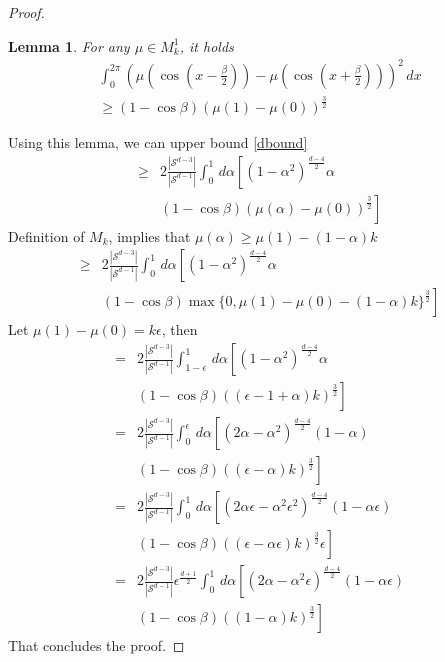 \documentclass[twoside]{article} \usepackage{aistats2017}
\newtheorem{lemma}[theorem]{Lemma}
\begin{document}
\begin{proof}
\begin{lemma}
        For any $\mu\in M_k^1$, it holds
        \begin{align*}
            \int_{0}^{2\pi}\left(\mu(\cos(x-\frac{\beta}{2}))-\mu( \cos(x+\frac{\beta}{2}))\right)^2\, dx\\
            \geq (1-\cos{\beta})(\mu(1)-\mu(0))^\frac{3}{2}
        \end{align*}
    \end{lemma}
    Using this lemma, we can upper bound \eqref{dbound} 
    \begin{align*}
        \geq&2\frac{|\mathcal{S}^{d-3}|}{|\mathcal{S}^{d-1}|}\int_{0}^{1}\,d\alpha\left[(1-\alpha^2)^{\frac{d-4}{2}}\alpha\right.\\
    &\left.(1-\cos{\beta})(\mu(\alpha)-\mu(0))^\frac{3}{2}\right]
    \end{align*}
    Definition of $M_k$, implies that $\mu(\alpha)\geq \mu(1)-(1-\alpha)k$
    \begin{align*}
        \geq&2\frac{|\mathcal{S}^{d-3}|}{|\mathcal{S}^{d-1}|}\int_{0}^{1}\,d\alpha\left[(1-\alpha^2)^{\frac{d-4}{2}}\alpha\right.\\
    &\left.(1-\cos{\beta})\max\{0,\mu(1)-\mu(0)-(1-\alpha)k\}^\frac{3}{2}\right]
    \end{align*}
Let $\mu(1)-\mu(0) =k\epsilon$, then
    \begin{align*}
        =&2\frac{|\mathcal{S}^{d-3}|}{|\mathcal{S}^{d-1}|}\int_{1-\epsilon}^{1}\,d\alpha\left[(1-\alpha^2)^{\frac{d-4}{2}}\alpha\right.\\
    &\left.(1-\cos{\beta})((\epsilon-1+\alpha)k)^\frac{3}{2}\right]\\
        =&2\frac{|\mathcal{S}^{d-3}|}{|\mathcal{S}^{d-1}|}\int_{0}^{\epsilon}\,d\alpha\left[(2\alpha-\alpha^2)^{\frac{d-4}{2}}(1-\alpha)\right.\\
    &\left.(1-\cos{\beta})((\epsilon-\alpha)k)^\frac{3}{2}\right]\\
    =&2\frac{|\mathcal{S}^{d-3}|}{|\mathcal{S}^{d-1}|}\int_{0}^{1}\,d\alpha\left[(2\alpha\epsilon-\alpha^2\epsilon^2)^{\frac{d-4}{2}}(1-\alpha\epsilon)\right.\\
    &\left.(1-\cos{\beta})((\epsilon-\alpha\epsilon)k)^\frac{3}{2}\epsilon\right]\\
    =&2\frac{|\mathcal{S}^{d-3}|}{|\mathcal{S}^{d-1}|}\epsilon^{\frac{d+1}{2}}\int_{0}^{1}\,d\alpha\left[(2\alpha-\alpha^2\epsilon)^{\frac{d-4}{2}}(1-\alpha\epsilon)\right.\\
    &\left.(1-\cos{\beta})((1-\alpha)k)^\frac{3}{2}\right]
    \end{align*}
    That concludes the proof.
\end{proof}
\end{document}
